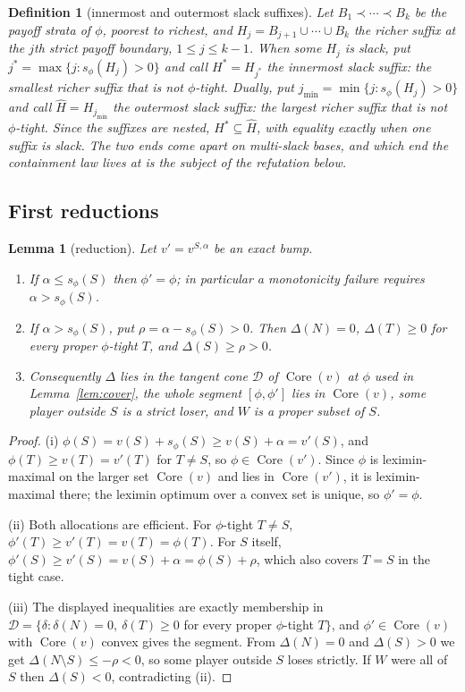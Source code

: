 \documentclass[11pt]{article}
\newtheorem{lemma}[theorem]{Lemma}
\newtheorem{definition}[theorem]{Definition}
\newcommand{\core}{\operatorname{Core}}
\begin{document}
\begin{definition}[innermost and outermost slack suffixes]\label{mono:def:hstar}
Let $B_1\prec\cdots\prec B_k$ be the payoff strata of $\phi$, poorest to
richest, and $H_j=B_{j+1}\cup\cdots\cup B_k$ the richer suffix at the $j$th
strict payoff boundary, $1\le j\le k-1$.  When some $H_j$ is slack, put
$j^*=\max\{j:s_\phi(H_j)>0\}$ and call $H^*=H_{j^*}$ the \emph{innermost
slack suffix}: the smallest richer suffix that is not $\phi$-tight.
Dually, put $j_{\min}=\min\{j:s_\phi(H_j)>0\}$ and call
$\widehat H=H_{j_{\min}}$ the \emph{outermost slack suffix}: the largest
richer suffix that is not $\phi$-tight.  Since the suffixes are nested,
$H^*\subseteq\widehat H$, with equality exactly when one suffix is slack.
The two ends come apart on \emph{multi-slack} bases, and which end the
containment law lives at is the subject of the refutation below.
\end{definition}

\subsection{First reductions}

\begin{lemma}[reduction]\label{mono:lem:reduce}
Let $v'=v^{S,\alpha}$ be an exact bump.
\begin{enumerate}[nosep,label=(\roman*)]
\item If $\alpha\le s_\phi(S)$ then $\phi'=\phi$; in particular a
      monotonicity failure requires $\alpha>s_\phi(S)$.
\item If $\alpha>s_\phi(S)$, put $\rho=\alpha-s_\phi(S)>0$.  Then
      $\Delta(N)=0$, $\Delta(T)\ge0$ for every proper $\phi$-tight $T$, and
      $\Delta(S)\ge\rho>0$.
\item Consequently $\Delta$ lies in the tangent cone
      $\mathcal D$ of $\core(v)$ at $\phi$ used in Lemma~\ref{lem:cover}, the
      whole segment $[\phi,\phi']$ lies in $\core(v)$, some player outside $S$
      is a strict loser, and $W$ is a proper subset of $S$.
\end{enumerate}
\end{lemma}

\begin{proof}
(i) $\phi(S)=v(S)+s_\phi(S)\ge v(S)+\alpha=v'(S)$, and $\phi(T)\ge
v(T)=v'(T)$ for $T\ne S$, so $\phi\in\core(v')$.  Since $\phi$ is
leximin-maximal on the larger set $\core(v)$ and lies in $\core(v')$, it is
leximin-maximal there; the leximin optimum over a convex set is unique, so
$\phi'=\phi$.

(ii) Both allocations are efficient.  For $\phi$-tight $T\ne S$,
$\phi'(T)\ge v'(T)=v(T)=\phi(T)$.  For $S$ itself,
$\phi'(S)\ge v'(S)=v(S)+\alpha=\phi(S)+\rho$, which also covers $T=S$ in the
tight case.

(iii) The displayed inequalities are exactly membership in
$\mathcal D=\{\delta:\delta(N)=0,\ \delta(T)\ge0$ for every proper
$\phi$-tight $T\}$, and $\phi'\in\core(v)$ with $\core(v)$ convex gives the
segment.  From $\Delta(N)=0$ and $\Delta(S)>0$ we get
$\Delta(N\setminus S)\le-\rho<0$, so some player outside $S$ loses strictly.
If $W$ were all of $S$ then $\Delta(S)<0$, contradicting (ii).
\end{proof}
\end{document}
